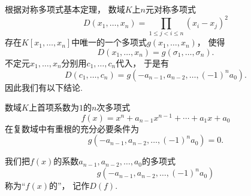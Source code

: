 根据对称多项式基本定理，
数域\(K\)上\(n\)元对称多项式\[
	D(x_1,\dotsc,x_n)
	=\prod_{1\leq j<i\leq n} (x_i-x_j)^2
\]
存在\(K[x_1,\dotsc,x_n]\)中唯一的一个多项式\(g(x_1,\dotsc,x_n)\)，
使得\[
	D(x_1,\dotsc,x_n)
	=g(\sigma_1,\dotsc,\sigma_n).
\]
不定元\(x_1,\dotsc,x_n\)分别用\(c_1,\dotsc,c_n\)代入，
于是有\[
	D(c_1,\dotsc,c_n)
	=g(-a_{n-1},a_{n-2},\dotsc,(-1)^n a_0).
\]
因此我们有以下结论.

\begin{proposition}
数域\(K\)上首项系数为\(1\)的\(n\)次多项式\[
	f(x)=x^n+a_{n-1} x^{n-1}+\dotsb+a_1 x+a_0
\]
在复数域中有重根的充分必要条件为\[
	g(-a_{n-1},a_{n-2},\dotsc,(-1)^n a_0)=0.
\]
\end{proposition}

我们把\(f(x)\)的系数\(a_{n-1},a_{n-2},\dotsc,a_0\)的多项式\[
	g(-a_{n-1},a_{n-2},\dotsc,(-1)^n a_0)
\]称为“\(f(x)\)的”，
记作\(D(f)\).

